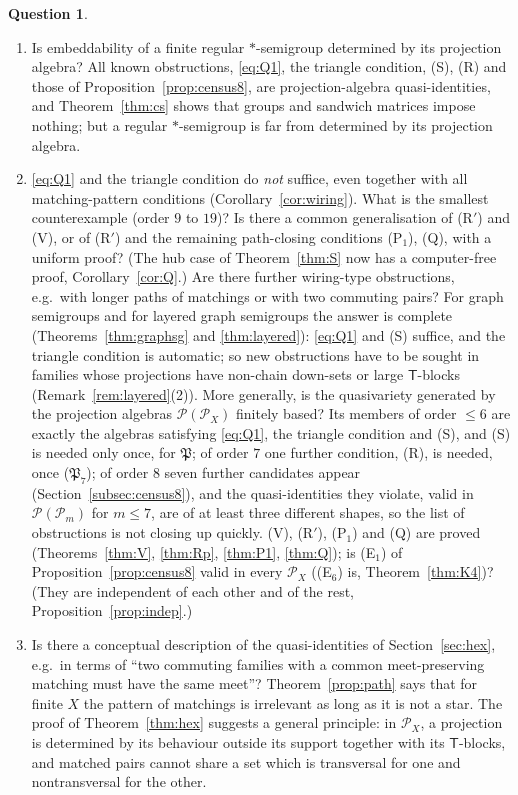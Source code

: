 \documentclass[11pt]{amsart}
\theoremstyle{definition}
\newtheorem{question}[theorem]{Question}
\renewcommand{\P}{\mathcal{P}}
\newcommand{\T}{\mathsf{T}}
\begin{document}
\begin{question}
\begin{enumerate}[label=\textup{(\arabic*)}]
\item Is embeddability of a finite regular $*$-semigroup determined by its projection algebra? All known obstructions, \eqref{eq:Q1}, the triangle condition, (S), (R) and those of Proposition~\ref{prop:census8}, are projection-algebra quasi-identities, and Theorem~\ref{thm:cs} shows that groups and sandwich matrices impose nothing; but a regular $*$-semigroup is far from determined by its projection algebra.
\item \eqref{eq:Q1} and the triangle condition do \emph{not} suffice, even together with all matching-pattern conditions (Corollary~\ref{cor:wiring}). What is the smallest counterexample (order $9$ to $19$)? Is there a common generalisation of (R$'$) and (V), or of (R$'$) and the remaining path-closing conditions (P$_1$), (Q), with a uniform proof? (The hub case of Theorem~\ref{thm:S} now has a computer-free proof, Corollary~\ref{cor:Q}.) Are there further wiring-type obstructions, e.g.\ with longer paths of matchings or with two commuting pairs? For graph semigroups and for layered graph semigroups the answer is complete (Theorems~\ref{thm:graphsg} and \ref{thm:layered}): \eqref{eq:Q1} and (S) suffice, and the triangle condition is automatic; so new obstructions have to be sought in families whose projections have non-chain down-sets or large $\T$-blocks (Remark~\ref{rem:layered}(2)). More generally, is the quasivariety generated by the projection algebras $\P(\P_X)$ finitely based? Its members of order $\le6$ are exactly the algebras satisfying \eqref{eq:Q1}, the triangle condition and (S), and (S) is needed only once, for $\mathfrak P$; of order $7$ one further condition, (R), is needed, once ($\mathfrak P_7$); of order $8$ seven further candidates appear (Section~\ref{subsec:census8}), and the quasi-identities they violate, valid in $\P(\P_m)$ for $m\le7$, are of at least three different shapes, so the list of obstructions is not closing up quickly. (V), (R$'$), (P$_1$) and (Q) are proved (Theorems~\ref{thm:V}, \ref{thm:Rp}, \ref{thm:P1}, \ref{thm:Q}); is (E$_1$) of Proposition~\ref{prop:census8} valid in every $\P_X$ ((E$_6$) is, Theorem~\ref{thm:K4})? (They are independent of each other and of the rest, Proposition~\ref{prop:indep}.)
\item Is there a conceptual description of the quasi-identities of Section~\ref{sec:hex}, e.g.\ in terms of ``two commuting families with a common meet-preserving matching must have the same meet''? Theorem~\ref{prop:path} says that for finite $X$ the pattern of matchings is irrelevant as long as it is not a star. The proof of Theorem~\ref{thm:hex} suggests a general principle: in $\P_X$, a projection is determined by its behaviour outside its support together with its $\T$-blocks, and matched pairs cannot share a set which is transversal for one and nontransversal for the other.

\end{enumerate}
\end{question}
\end{document}
